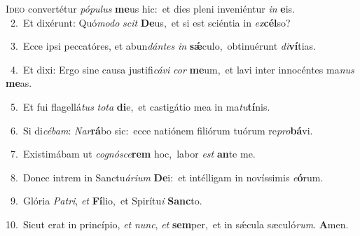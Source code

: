 \lettrine{\initial\textcolor{\initialcolor}{I}}{deo} convertétur \textit{pó}\-\textit{pu}\textit{lus} \textbf{me}\-us hic:~\star et dies pleni inveniéntur \textit{in} \textbf{e}\-is.\\
{\numbfont\textcolor{\numbcolor}{~2.}}~Et dixérunt: Quó\-\textit{mo}\-\textit{do} \textit{scit} \textbf{De}\-us,~\star et si est sciéntia in \textit{ex}\-\textbf{cél}so?\par
{\numbfont\textcolor{\numbcolor}{~3.}}~Ecce ipsi peccatóres, et abun\-\textit{dán}\-\textit{tes} \textit{in} \textbf{sǽ}\-culo,~\star obtinuérunt \textit{di}\-\textbf{ví}tias.\par
{\numbfont\textcolor{\numbcolor}{~4.}}~Et dixi: Ergo sine causa justifi\-\textit{cá}\-\textit{vi} \textit{cor} \textbf{me}\-um,~\star et lavi inter innocéntes ma\textit{nus} \textbf{me}\-as.\par
{\numbfont\textcolor{\numbcolor}{~5.}}~Et fui flagellá\textit{tus} \textit{to}\-\textit{ta} \textbf{di}\-e,~\star et castigátio mea in ma\-\textit{tu}\-\textbf{tí}nis.\par
{\numbfont\textcolor{\numbcolor}{~6.}}~Si di\-\textit{cé}\-\textit{bam}: \textit{Nar}\-\textbf{rá}bo sic:~\star ecce natiónem filiórum tuórum re\-\textit{pro}\-\textbf{bá}vi.\par
{\numbfont\textcolor{\numbcolor}{~7.}}~Existimábam ut \textit{co}\-\textit{gnó}\textit{sce}\textbf{rem} hoc,~\star labor \textit{est} \textbf{an}\-te me.\par
{\numbfont\textcolor{\numbcolor}{~8.}}~Donec intrem in Sanctu\-\textit{á}\-\textit{ri}\textit{um} \textbf{De}\-i:~\star et intélligam in novíssimis \textit{e}\-\textbf{ó}rum.\par
{\numbfont\textcolor{\numbcolor}{~9.}}~Glória \textit{Pa}\-\textit{tri}, \textit{et} \textbf{Fí}\-lio,~\star et Spirítu\textit{i} \textbf{Sanc}\-to.\par
{\numbfont\textcolor{\numbcolor}{10.}}~Sicut erat in princípio, \textit{et} \textit{nunc}\-, \textit{et} \textbf{sem}\-per,~\star et in sǽcula sæculó\-\textit{rum}\-. \textbf{A}\-men.\par
